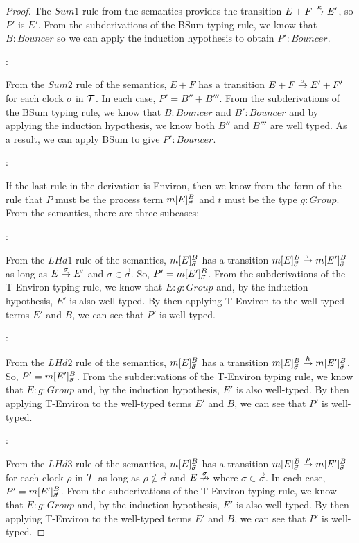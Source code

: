 \begin{proof}
\noindent The $Sum1$ rule from the semantics provides the transition
$E + F \stackrel{\kappa}{\rightarrow} E'$, so $P'$ is $E'$.  From the
subderivations of the BSum typing rule, we know that $B : Bouncer$
so we can apply the induction hypothesis to obtain $P' : Bouncer$.

:

\noindent From the $Sum2$ rule of the semantics, $E + F$ has a
transition $E + F \stackrel{\sigma}{\rightarrow} E' + F'$ for each clock $\sigma$ in
$\text{$\mathcal{T}$}$.  In each case, $P' = B'' + B'''$.  From the subderivations
of the BSum typing rule, we know that $B : Bouncer$ and $B' : Bouncer$
and by applying the induction hypothesis, we know both $B''$ and
$B'''$ are well typed.  As a result, we can apply BSum to give $P' :
Bouncer$.

:

\noindent If the last rule in the derivation is Environ, then we know
from the form of the rule that $P$ must be the process term
${m}[ E ]^{B}_{\vec{\sigma}}$ and $t$ must be the type $g : Group$.
From the semantics, there are three subcases:

:

\noindent From the $LHd1$ rule of the semantics,
${m}[ E ]^{B}_{\vec{\sigma}}$ has a transition
${m}[ E ]^{B}_{\vec{\sigma}} \stackrel{\tau}{\rightarrow}
{m}[ E' ]^{B}_{\vec{\sigma}}$ as long as $E \stackrel{\sigma}{\rightarrow} E'$ and
$\sigma \in \vec{\sigma}$.  So, $P' = {m}[ E' ]^{B}_{\vec{\sigma}}$.
From the subderivations of the T-Environ typing rule, we know that $E
: g : Group$ and, by the induction hypothesis, $E'$ is also
well-typed.  By then applying T-Environ to the well-typed terms $E'$
and $B$, we can see that $P'$ is well-typed.

:

\noindent From the $LHd2$ rule of the semantics,
${m}[ E ]^{B}_{\vec{\sigma}}$ has a transition
${m}[ E ]^{B}_{\vec{\sigma}} \stackrel{h}{\rightarrow}
{m}[ E' ]^{B}_{\vec{\sigma}}$.  So, $P' =
{m}[ E' ]^{B}_{\vec{\sigma}}$.  From the subderivations of the
T-Environ typing rule, we know that $E : g : Group$ and, by the
induction hypothesis, $E'$ is also well-typed.  By then applying
T-Environ to the well-typed terms $E'$ and $B$, we can see that $P'$
is well-typed.

:

\noindent From the $LHd3$ rule of the semantics,
${m}[ E ]^{B}_{\vec{\sigma}}$ has a transition
${m}[ E ]^{B}_{\vec{\sigma}} \stackrel{\rho}{\rightarrow}
{m}[ E' ]^{B}_{\vec{\sigma}}$ for each clock $\rho$ in $\text{$\mathcal{T}$}$ as
long as $\rho \not \in \vec{\sigma}$ and $E \stackrel{\sigma}{\nrightarrow}$ where
$\sigma \in \vec{\sigma}$.  In each case, $P' =
{m}[ E' ]^{B}_{\vec{\sigma}}$.  From the subderivations of the
T-Environ typing rule, we know that $E : g : Group$ and, by the
induction hypothesis, $E'$ is also well-typed.  By then applying
T-Environ to the well-typed terms $E'$ and $B$, we can see that $P'$
is well-typed.


\end{proof}
